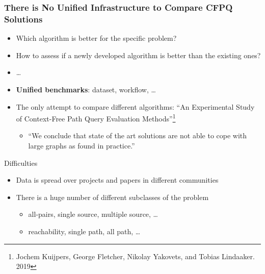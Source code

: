 \documentclass[xcolor=table,aspectratio=169]{beamer}
\begin{document}
\begin{frame}[fragile]
  \frametitle{There is No Unified Infrastructure to Compare CFPQ Solutions}  
  \begin{itemize}
    \item[\faQuestion] Which algorithm is better for the specific problem?    
    \item[\faQuestion] How to assess if a newly developed algorithm is better than the existing ones?
    \item[\faQuestion] \ldots 
    \pause 
    \item[\faLightbulb] \textbf{Unified benchmarks}: dataset, workflow, \ldots
    \pause 
    \item[\faExclamation] The only attempt to compare different algorithms: ``An Experimental Study of Context-Free Path Query Evaluation Methods''\footnote{Jochem Kuijpers, George Fletcher, Nikolay Yakovets, and Tobias Lindaaker. 2019}
      \pause
      \begin{itemize}
      \item[\faFrown] ``We conclude that state of the art solutions are not able to cope with large graphs as found in practice.''
      \end{itemize}
    \end{itemize}
  \pause
  \vfill
  Difficulties
    \begin{itemize}
      \item Data is spread over projects and papers in different communities
      \item There is a huge number of different subclasses of the problem
      \begin{itemize}
        \item all-pairs, single source, multiple source, \dots 
        \item reachability, single path, all path, \dots 
      \end{itemize}
  \end{itemize}
\end{frame}
\end{document}
